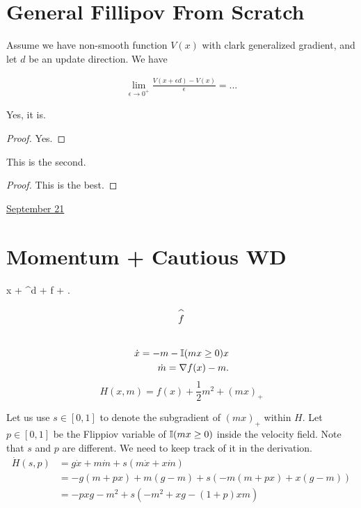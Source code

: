 \documentclass[letterpaper,11pt]{article}
\begin{document}
\section{General Fillipov From Scratch}

\begin{ctheorem}
Assume we have non-smooth function $V(x)$ with clark generalized gradient, and let $d$ be an update direction. We have 
\end{ctheorem} 
\begin{cproof} 
\begin{align*}
\lim_{\epsilon \to 0^+}\frac{V(x + \epsilon d) - V(x)}{\epsilon} 
= ... 
\end{align*}  
\end{cproof}   

\begin{thm}
    Yes, it is. 
\end{thm}
\begin{proof} 
    Yes. 
\end{proof}    

\begin{theorem}
    This is the second. 
\end{theorem}
\begin{proof}
    This is the best. 
\end{proof}     





\clearpage


\href{run:2025-09-21-momentum_cwd.tex}{\Huge September 21} 

\section{Momentum + Cautious WD}

\bb
\dot x + \RR^d + \dd f + \E[x]. 
\ee 
$$
\reallywidehat f
$$

\begin{align}
    \dot x = - m - \mathbb{I}(mx\geq 0) x \\ 
    \dot m = \nabla f(x) - m. 
\end{align}
$$
H(x, m) = f(x) + \frac{1}{2} m^2 + (mx)_+
$$

Let us use $s \in[0,1]$ to denote the subgradient of $(mx)_+$ within $H$. Let $p \in[0,1]$ be the Flippiov variable of $\mathbb{I}(mx \geq 0)$ inside the velocity field. Note that $s$ and $p$ are different. We need to keep track of it in the derivation. 
\begin{align*}
\dot H(s,p) &  =  g \dot x + m \dot m + s (m \dot x + x \dot m) \\ 
& = -g (m + p x) + m(g - m) + s (-m (m + p x) + x (g - m) )\\
& = - p x g - m^2 + s (- m^2 + xg - (1+p)xm)
\end{align*}
\end{document}
